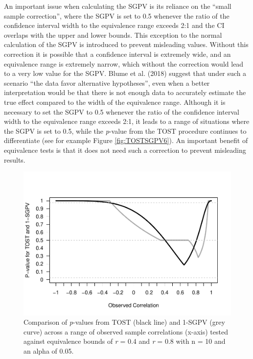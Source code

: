 \documentclass[,man,floatsintext]{apa6}
\begin{document}
An important issue when calculating the SGPV is its reliance on the
\enquote{small sample correction}, where the SGPV is set to 0.5 whenever
the ratio of the confidence interval width to the equivalence range
exceeds 2:1 and the CI overlaps with the upper and lower bounds. This
exception to the normal calculation of the SGPV is introduced to prevent
misleading values. Without this correction it is possible that a
confidence interval is extremely wide, and an equivalence range is
extremely narrow, which without the correction would lead to a very low
value for the SGPV. Blume et al. (2018) suggest that under such a
scenario \enquote{the data favor alternative hypotheses}, even when a
better interpretation would be that there is not enough data to
accurately estimate the true effect compared to the width of the
equivalence range. Although it is necessary to set the SGPV to 0.5
whenever the ratio of the confidence interval width to the equivalence
range exceeds 2:1, it leads to a range of situations where the SGPV is
set to 0.5, while the \emph{p}-value from the TOST procedure continues
to differentiate (see for example Figure \ref{fig:TOSTSGPV6}). An
important benefit of equivalence tests is that it does not need such a
correction to prevent misleading results.

\begin{figure}
\centering
\includegraphics{manuscript.R1_files/figure-latex/TOSTSGPV13-1.pdf}
\caption{\label{fig:TOSTSGPV13}Comparison of \emph{p}-values from TOST
(black line) and 1-SGPV (grey curve) across a range of observed sample
correlations (x-axis) tested against equivalence bounds of \emph{r} =
0.4 and \emph{r} = 0.8 with n = 10 and an alpha of 0.05.}
\end{figure}
\end{document}
